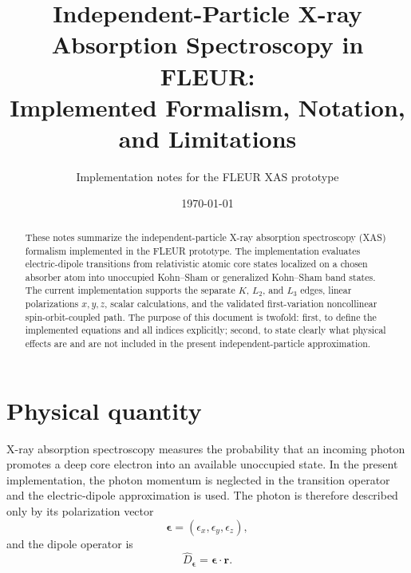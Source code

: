 \documentclass[11pt,a4paper]{article}
\title{Independent-Particle X-ray Absorption Spectroscopy in FLEUR:\\
Implemented Formalism, Notation, and Limitations}
\author{Implementation notes for the FLEUR XAS prototype}
\date{\today}
\newcommand{\rvec}{\mathbf{r}}
\newcommand{\epsvec}{\boldsymbol{\epsilon}}
\begin{document}
\maketitle

\begin{abstract}
These notes summarize the independent-particle X-ray absorption spectroscopy
(XAS) formalism implemented in the FLEUR prototype. The implementation evaluates
electric-dipole transitions from relativistic atomic core states localized on a
chosen absorber atom into unoccupied Kohn--Sham or generalized Kohn--Sham band
states. The current implementation supports the separate \(K\), \(L_2\), and
\(L_3\) edges, linear polarizations \(x,y,z\), scalar calculations, and the
validated first-variation noncollinear spin-orbit-coupled path. The purpose of
this document is twofold: first, to define the implemented equations and all
indices explicitly; second, to state clearly what physical effects are and are
not included in the present independent-particle approximation.
\end{abstract}

\section{Physical quantity}

X-ray absorption spectroscopy measures the probability that an incoming photon
promotes a deep core electron into an available unoccupied state. In the present
implementation, the photon momentum is neglected in the transition operator
and the electric-dipole approximation is used. The photon is therefore described
only by its polarization vector
\begin{equation}
  \epsvec = (\epsilon_x,\epsilon_y,\epsilon_z),
\end{equation}
and the dipole operator is
\begin{equation}
  \hat{D}_{\epsvec} = \epsvec \cdot \rvec .
\end{equation}
\end{document}
